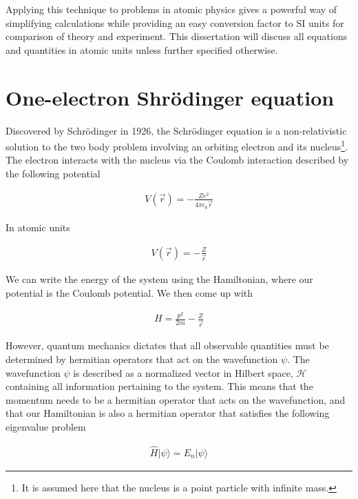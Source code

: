         Applying this technique to problems in atomic physics gives a powerful way of simplifying calculations while providing an easy conversion factor to SI units for comparison of theory and experiment. This dissertation will discuss all equations and quantities in atomic units unless further specified otherwise.


    \section{One-electron Shrödinger equation} \label{sec:Schrodinger_Equation}
        Discovered by Schrödinger in 1926, the Schrödinger equation is a non-relativistic solution to the two body problem involving an orbiting electron and its nucleus\footnote{It is assumed here that the nucleus is a point particle with infinite mass.}. The electron interacts with the nucleus via the Coulomb interaction described by the following potential

        \begin{align}
            V(\vec{r}) = -\frac{Z e^2}{4\pi \epsilon_0 \vec{r}}
        \end{align}

        In atomic units 

        \begin{align}
            V(\vec{r}) = -\frac{Z}{\vec{r}}
        \end{align}

        \noindent We can write the energy of the system using the Hamiltonian, where our potential is the Coulomb potential. We then come up with 

        \begin{align}
            H = \frac{p^2}{2m} - \frac{Z}{\vec{r}}
        \end{align}

        \noindent However, quantum mechanics dictates that all observable quantities must be determined by hermitian operators that act on the wavefunction $\psi$. The wavefunction $\psi$ is described as a normalized vector in Hilbert space, $\mathcal{H}$ containing all information pertaining to the system. This means that the momentum needs to be a hermitian operator that acts on the wavefunction, and that our Hamiltonian is also a hermitian operator that satisfies the following eigenvalue problem 

        \begin{align}
            \hat{H} \vert\psi \rangle = E_n \vert \psi \rangle
        \end{align}

